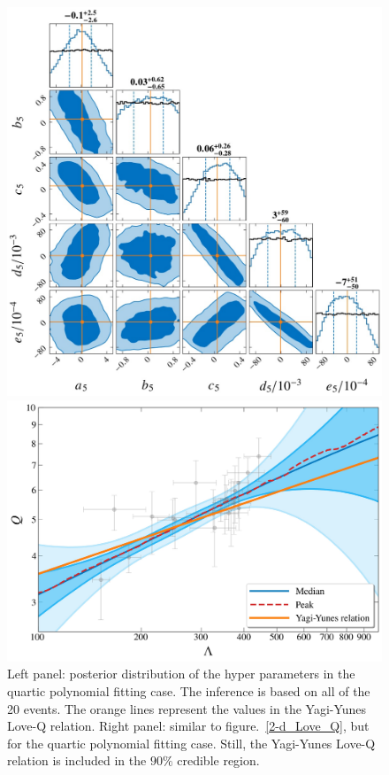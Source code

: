 \documentclass[a4paper,11pt]{article}
\begin{document}
\begin{figure}
\begin{minipage}[t]{0.49\textwidth}
\centering
\includegraphics[width=0.8\linewidth]{Hyper_parameter_5d.pdf}%
\end{minipage}
\hfill
\begin{minipage}[t]{0.49\textwidth}
\includegraphics[width=\linewidth]{hierarchical_results_AP4_5d.pdf}
\end{minipage}
\caption{\label{5-d_Love_Q} Left panel: posterior distribution of the hyper parameters in the quartic polynomial fitting case. 
    The inference is based on all of the 20 events. The orange lines represent the values in the Yagi-Yunes Love-Q relation. 
    Right panel: similar to figure.~\ref{2-d_Love_Q}, but for the quartic polynomial fitting case. 
    Still, the Yagi-Yunes Love-Q relation is included in the $90\%$ credible region.} 
\end{figure}
\end{document}
